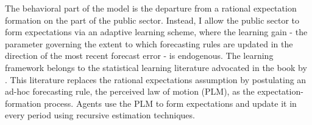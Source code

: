\documentclass[11pt]{article}
\renewcommand{\[}{\begin{equation}}
\renewcommand{\]}{\end{equation}}
\begin{document}
The behavioral part of the model is the departure from a rational expectation formation on the part of the public sector. Instead, I allow the public sector to form expectations via an adaptive learning scheme, where the learning gain - the parameter governing the extent to which forecasting rules are updated in the direction of the most recent forecast error - is endogenous. The learning framework belongs to the statistical learning literature advocated in the book by \cite{evans_honkapohja2001}. This literature replaces the rational expectations assumption by postulating an ad-hoc forecasting rule, the perceived law of motion (PLM), as the expectation-formation process. Agents use the PLM to form expectations and update it in every period using recursive estimation techniques. 

%

%
\end{document}
